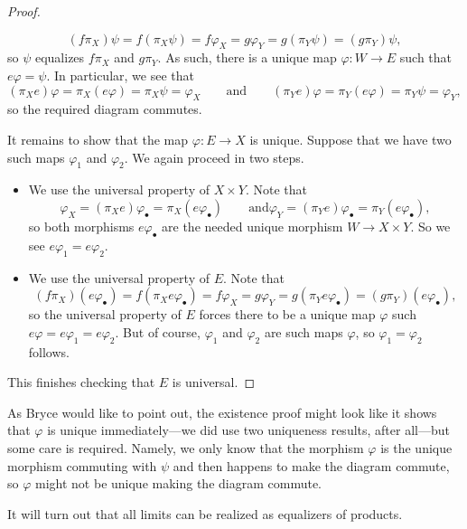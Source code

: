 \documentclass[../notes.tex]{subfiles}
\begin{document}
\begin{proof}
\begin{itemize}
		\[(f\pi_X)\psi=f(\pi_X\psi)=f\varphi_X=g\varphi_Y=g(\pi_Y\psi)=(g\pi_Y)\psi,\]
		so $\psi$ equalizes $f\pi_X$ and $g\pi_Y$. As such, there is a unique map $\varphi:W\to E$ such that $e\varphi=\psi$. In particular, we see that
		\[(\pi_Xe)\varphi=\pi_X(e\varphi)=\pi_X\psi=\varphi_X\qquad\text{and}\qquad(\pi_Ye)\varphi=\pi_Y(e\varphi)=\pi_Y\psi=\varphi_Y,\]
		so the required diagram commutes.
	\end{itemize}
	It remains to show that the map $\varphi:E\to X$ is unique. Suppose that we have two such maps $\varphi_1$ and $\varphi_2$. We again proceed in two steps.
	\begin{itemize}
		\item We use the universal property of $X\times Y$. Note that
		\[\varphi_X=(\pi_Xe)\varphi_\bullet=\pi_X(e\varphi_\bullet)\qquad\text{and}\varphi_Y=(\pi_Ye)\varphi_\bullet=\pi_Y(e\varphi_\bullet),\]
		so both morphisms $e\varphi_\bullet$ are the needed unique morphism $W\to X\times Y$. So we see $e\varphi_1=e\varphi_2$.
		\item We use the universal property of $E$. Note that
		\[(f\pi_X)(e\varphi_\bullet)=f(\pi_Xe\varphi_\bullet)=f\varphi_X=g\varphi_Y=g(\pi_Ye\varphi_\bullet)=(g\pi_Y)(e\varphi_\bullet),\]
		so the universal property of $E$ forces there to be a unique map $\varphi$ such $e\varphi=e\varphi_1=e\varphi_2$. But of course, $\varphi_1$ and $\varphi_2$ are such maps $\varphi$, so $\varphi_1=\varphi_2$ follows.
	\end{itemize}
	This finishes checking that $E$ is universal.
\end{proof}
\begin{remark}[Bryce]
	As Bryce would like to point out, the existence proof might look like it shows that $\varphi$ is unique immediately---we did use two uniqueness results, after all---but some care is required. Namely, we only know that the morphism $\varphi$ is the unique morphism commuting with $\psi$ and then happens to make the diagram commute, so $\varphi$ might not be unique making the diagram commute.
\end{remark}
\begin{remark}[Bryce]
	It will turn out that all limits can be realized as equalizers of products.
\end{remark}
\end{document}
